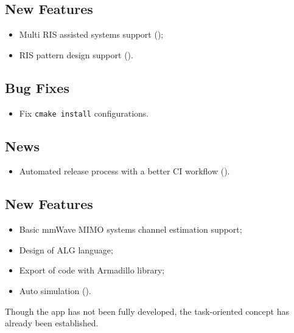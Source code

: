 \subsection*{New Features}
\begin{itemize}
  \item Multi RIS assisted systems support ();
  \item RIS pattern design support ().
\end{itemize}
\subsection*{Bug Fixes}
\begin{itemize}
  \item Fix \texttt{cmake install} configurations.
\end{itemize}
\subsection*{News}
\begin{itemize}
  \item Automated release process with a better CI workflow ().
\end{itemize}

\subsection*{New Features}
\begin{itemize}
  \item Basic mmWave MIMO systems channel estimation support;
  \item Design of ALG language;
  \item Export of code with Armadillo library;
  \item Auto simulation ().
\end{itemize}

Though the app has not been fully developed,
the task-oriented concept has already been established.

